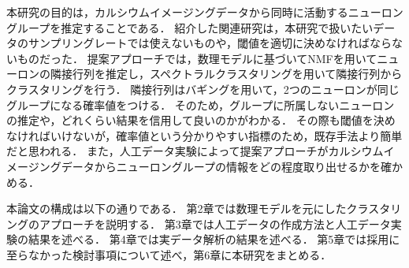 本研究の目的は，カルシウムイメージングデータから同時に活動するニューロングループを推定することである．
紹介した関連研究は，本研究で扱いたいデータのサンプリングレートでは使えないものや，閾値を適切に決めなければならないものだった．
提案アプローチでは，数理モデルに基づいてNMFを用いてニューロンの隣接行列を推定し，スペクトラルクラスタリングを用いて隣接行列からクラスタリングを行う．
隣接行列はバギングを用いて，2つのニューロンが同じグループになる確率値をつける．
そのため，グループに所属しないニューロンの推定や，どれくらい結果を信用して良いのかがわかる．
その際も閾値を決めなければいけないが，確率値という分かりやすい指標のため，既存手法より簡単だと思われる．
また，人工データ実験によって提案アプローチがカルシウムイメージングデータからニューロングループの情報をどの程度取り出せるかを確かめる．

本論文の構成は以下の通りである．
第2章では数理モデルを元にしたクラスタリングのアプローチを説明する．
第3章では人工データの作成方法と人工データ実験の結果を述べる．
第4章では実データ解析の結果を述べる．
第5章では採用に至らなかった検討事項について述べ，第6章に本研究をまとめる．
